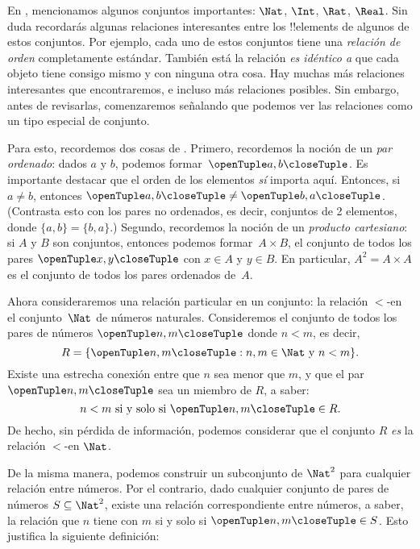 \documentclass[../../../include/open-logic-section]{subfiles}
\begin{document}

\begin{explain}
En , mencionamos algunos conjuntos importantes: $\Nat$, $\Int$, $\Rat$, $\Real$. Sin duda recordarás algunas relaciones interesantes entre los !!{element}s de algunos de estos conjuntos. Por ejemplo, cada uno de estos conjuntos tiene una \emph{relación de orden} completamente estándar. También está la relación \emph{es idéntico a} que cada objeto tiene consigo mismo y con ninguna otra cosa. Hay muchas más relaciones interesantes que encontraremos, e incluso más relaciones posibles. Sin embargo, antes de revisarlas, comenzaremos señalando que podemos ver las relaciones como un tipo especial de conjunto.

Para esto, recordemos dos cosas de . Primero, recordemos la noción de un \emph{par ordenado}: dados $a$ y $b$, podemos formar~$\tuple{a, b}$. Es importante destacar que el orden de los elementos \emph{sí} importa aquí. Entonces, si $a \neq b$, entonces $\tuple{a, b} \neq \tuple{b, a}$. (Contrasta esto con los pares no ordenados, es decir, conjuntos de 2 elementos, donde $\{a, b\}=\{b, a\}$.) Segundo, recordemos la noción de un \emph{producto cartesiano}: si $A$ y $B$ son conjuntos, entonces podemos formar~$A \times B$, el conjunto de todos los pares $\tuple{x, y}$ con $x \in A$ y $y \in B$. En particular, $A^{2}= A \times A$ es el conjunto de todos los pares ordenados de~$A$.

Ahora consideraremos una relación particular en un conjunto: la relación $<$-en el conjunto~$\Nat$ de números naturales. Consideremos el conjunto de todos los pares de números $\tuple{n, m}$ donde $n<m$, es decir,
\[
R=\Setabs{\tuple{n, m}}{n, m \in \Nat \text{ y } n<m}.
\]
Existe una estrecha conexión entre que $n$ sea menor que $m$, y que el par $\tuple{n, m}$ sea un miembro de $R$, a saber:
\[
n<m\text{ si y solo si }\tuple{n, m} \in R.
\]
De hecho, sin pérdida de información, podemos considerar que el conjunto $R$ \emph{es} la relación $<$-en $\Nat$.

De la misma manera, podemos construir un subconjunto de $\Nat^{2}$ para cualquier relación entre números. Por el contrario, dado cualquier conjunto de pares de números $S \subseteq \Nat^{2}$, existe una relación correspondiente entre números, a saber, la relación que $n$ tiene con $m$ si y solo si $\tuple{n, m} \in S$. Esto justifica la siguiente definición:
\end{explain}
\end{document}
